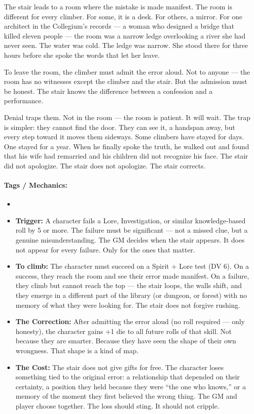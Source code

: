 The stair leads to a room where the mistake is made manifest. The room is different for every climber. For some, it is a desk. For others, a mirror. For one architect in the Collegium's records --- a woman who designed a bridge that killed eleven people --- the room was a narrow ledge overlooking a river she had never seen. The water was cold. The ledge was narrow. She stood there for three hours before she spoke the words that let her leave.

To leave the room, the climber must admit the error aloud. Not to anyone --- the room has no witnesses except the climber and the stair. But the admission must be honest. The stair knows the difference between a confession and a performance.

Denial traps them. Not in the room --- the room is patient. It will wait. The trap is simpler: they cannot find the door. They can see it, a handspan away, but every step toward it moves them sideways. Some climbers have stayed for days. One stayed for a year. When he finally spoke the truth, he walked out and found that his wife had remarried and his children did not recognize his face. The stair did not apologize. The stair does not apologize. The stair corrects.

\paragraph{Tags / Mechanics:}
\begin{itemize}
\item [TRUTH] [DREAM] [THRESHOLD]
\item \textbf{Trigger:} A character fails a Lore, Investigation, or similar knowledge-based roll by 5 or more. The failure must be significant --- not a missed clue, but a genuine misunderstanding. The GM decides when the stair appears. It does not appear for every failure. Only for the ones that matter.
\item \textbf{To climb:} The character must succeed on a Spirit + Lore test (DV 6). On a success, they reach the room and see their error made manifest. On a failure, they climb but cannot reach the top --- the stair loops, the walls shift, and they emerge in a different part of the library (or dungeon, or forest) with no memory of what they were looking for. The stair does not forgive rushing.
\item \textbf{The Correction:} After admitting the error aloud (no roll required --- only honesty), the character gains +1 die to all future rolls of that skill. Not because they are smarter. Because they have seen the shape of their own wrongness. That shape is a kind of map.
\item \textbf{The Cost:} The stair does not give gifts for free. The character loses something tied to the original error: a relationship that depended on their certainty, a position they held because they were ``the one who knows,'' or a memory of the moment they first believed the wrong thing. The GM and player choose together. The loss should sting. It should not cripple.
\end{itemize}

